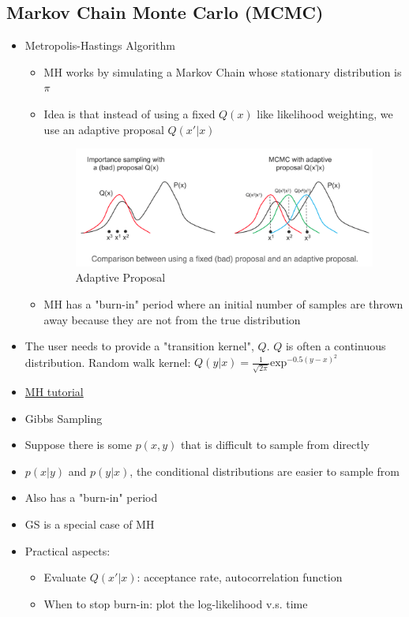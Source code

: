\documentclass[../main.tex]{subfiles}
\begin{document}
\subsection{Markov Chain Monte Carlo (MCMC)}
\begin{itemize}
  \item Metropolis-Hastings Algorithm
  \begin{itemize}
    \item MH works by simulating a Markov Chain whose stationary distribution is $\pi$
    \item Idea is that instead of using a fixed $Q(x)$ like likelihood weighting, we use an adaptive proposal $Q(x'|x)$
    \begin{figure}[h]
      \caption{Adaptive Proposal}
      \centering
      \includegraphics[width=\textwidth]{../imgs/adaptive_proposal.png}
    \end{figure}
    \item MH has a "burn-in" period where an initial number of samples are thrown away because they are not from the true distribution
  \end{itemize}
  \item The user needs to provide a "transition kernel", $Q$. $Q$ is often a continuous distribution. Random walk kernel: $Q(y|x) = \frac{1}{\sqrt{2\pi}}\text{exp}^{-0.5(y-x)^{2}}$
  \item \href{https://stephens999.github.io/fiveMinuteStats/MH_intro.html}{MH tutorial}
  \item Gibbs Sampling
  \item Suppose there is some $p(x,y)$ that is difficult to sample from directly
  \item $p(x|y)$ and $p(y|x)$, the conditional distributions are easier to sample from
  \item Also has a "burn-in" period
  \item GS is a special case of MH
  \item Practical aspects:
  \begin{itemize}
    \item Evaluate $Q(x'|x)$: acceptance rate, autocorrelation function
    \item When to stop burn-in: plot the log-likelihood v.s. time
  \end{itemize}
\end{itemize}
\end{document}
